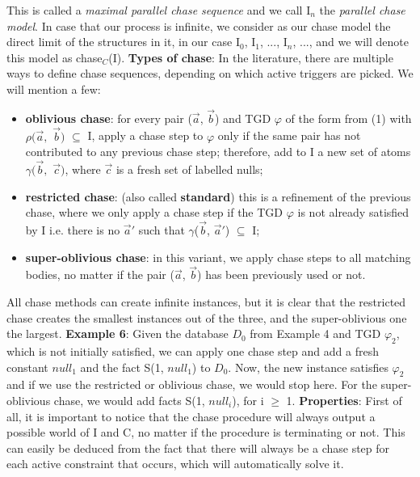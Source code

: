 \documentclass[11pt, a4paper, dvipsnames]{article}
\begin{document}
This is called a \textit{maximal parallel chase sequence} and we call I$_{n}$ the \textit{parallel chase model}. In case that our process is infinite, we consider as our chase model the direct limit of the structures in it, in our case I$_{0}$, I$_{1}$, ..., I$_{n}$, ..., and we will denote this model as chase$_{C}$(I).\newline
\textbf{Types of chase}: In the literature, there are multiple ways to define chase sequences, depending on which active triggers are picked. We will mention a few:
\begin{itemize}
	\item \textbf{oblivious chase}: for every pair ($\vec{a}$, $\vec{b}$) and TGD $\varphi$ of the form from (1) with $\rho(\vec{a},$ $\vec{b})$ $\subseteq$ I, apply a chase step to $\varphi$ only if the same pair has not contributed to any previous chase step; therefore, add to I a new set of atoms $\gamma(\vec{b},$ $\vec{c})$, where $\vec{c}$ is a fresh set of labelled nulls;
	\item \textbf{restricted chase}: (also called \textbf{standard}) this is a refinement of the previous chase, where we only apply a chase step if the TGD $\varphi$ is not already satisfied by I i.e. there is no $\vec{a}'$ such that $\gamma$($\vec{b}$, $\vec{a}'$) $\subseteq$ I;
	\item \textbf{super-oblivious chase}: in this variant, we apply chase steps to all matching bodies, no matter if the pair ($\vec{a}$, $\vec{b}$) has been previously used or not.
\end{itemize}
All chase methods can create infinite instances, but it is clear that the restricted chase creates the smallest instances out of the three, and the super-oblivious one the largest.\newline
\textbf{Example 6}: Given the database $D_{0}$ from Example 4 and TGD $\varphi_{2}$, which is not initially satisfied, we can apply one chase step and add a fresh constant $null_{1}$ and the fact S(1, $null_{1}$) to $D_{0}$. Now, the new instance satisfies $\varphi_{2}$ and if we use the restricted or oblivious chase, we would stop here. For the super-oblivious chase, we would add facts S(1, $null_{i}$), for i $\geq$ 1. \newline
\textbf{Properties}: First of all, it is important to notice that the chase procedure will always output a possible world of I and C, no matter if the procedure is terminating or not. This can easily be deduced from the fact that there will always be a chase step for each active constraint that occurs, which will automatically solve it.\newline
\end{document}
